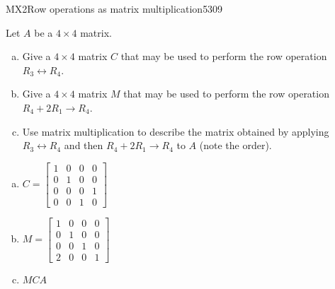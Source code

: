 \begin{exercise}{MX2}{Row operations as matrix multiplication}{5309} 
\begin{exerciseStatement} 

Let \(A\) be a \(4 \times 4\) matrix.

 

\begin{enumerate}[(a)]
\item Give a \(4 \times 4\) matrix \(C\) that may be used to perform the row operation \(R_3 \leftrightarrow R_4\).
\item Give a \(4 \times 4\) matrix \(M\) that may be used to perform the row operation \(R_4 + 2 R_1 \to R_4\).
\item Use matrix multiplication to describe the matrix obtained by applying \(R_3 \leftrightarrow R_4\) and then \(R_4 + 2 R_1 \to R_4\) to \(A\) (note the order). 
\end{enumerate}

     \end{exerciseStatement}
 \begin{exerciseAnswer} 

\begin{enumerate}[(a)]
\item \(C=\left[\begin{array}{cccc}
1 & 0 & 0 & 0 \\
0 & 1 & 0 & 0 \\
0 & 0 & 0 & 1 \\
0 & 0 & 1 & 0
\end{array}\right]\)
\item \(M=\left[\begin{array}{cccc}
1 & 0 & 0 & 0 \\
0 & 1 & 0 & 0 \\
0 & 0 & 1 & 0 \\
2 & 0 & 0 & 1
\end{array}\right]\)
\item  \(MCA\) 
\end{enumerate}

     \end{exerciseAnswer}
 \end{exercise}


